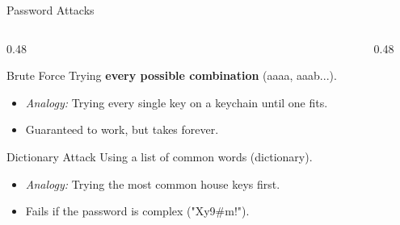 \documentclass[aspectratio=169]{beamer}  %
\begin{document}
\begin{frame}{Password Attacks}
    \begin{columns}[T]
        \begin{column}{0.48\textwidth}
            \begin{block}{Brute Force}
                \footnotesize
                Trying \textbf{every possible combination} (aaaa, aaab...).
                \begin{itemize}
                    \item \textit{Analogy:} Trying every single key on a keychain until one fits.
                    \item Guaranteed to work, but takes forever.
                \end{itemize}
            \end{block}
            \begin{block}{Dictionary Attack}
                \footnotesize
                Using a list of common words (dictionary).
                \begin{itemize}
                    \item \textit{Analogy:} Trying the most common house keys first.
                    \item Fails if the password is complex ("Xy9\#m!").
                \end{itemize}
            \end{block}
        \end{column}
        \begin{column}{0.48\textwidth}
            \begin{center}
            \end{center}
        \end{column}
    \end{columns}
\end{frame}
\end{document}
